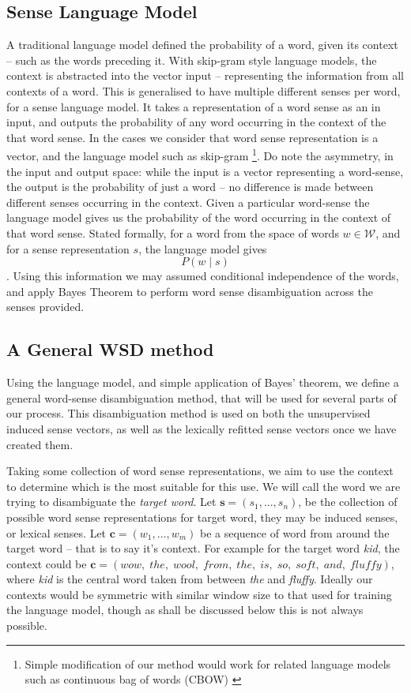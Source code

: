 \documentclass{sig-alternate}
\newcommand{\W}{\mathcal{W}}
\renewcommand{\c}{\mathbf{c}}
\newcommand{\s}{\mathbf{s}}
\begin{document}
\subsection{Sense Language Model} \label{senselanguagemodel}
A traditional language model defined the probability of a word, given its context -- such as the words preceding it.
With skip-gram style language models, the context is abstracted into the vector input -- representing the information from all contexts of a word. This is generalised to have multiple different senses per word, for a sense language model.
It takes a representation of a word sense as an in input, and outputs the probability of any word occurring in the context of the that word sense. In the cases we consider that word sense representation is a vector, and the language model such as skip-gram\parencite{mikolov2013efficient} \footnote{Simple modification of our method would work for related language models such as continuous bag of words (CBOW) \parencite{mikolov2013efficient}}. Do note the asymmetry, in the input and output space: while the input is a vector representing a word-sense, the output is the probability of just a word -- no difference is made between different senses occurring in the context. Given a particular word-sense the language model gives us the probability of the word occurring in the context of that word sense. Stated formally, for a word from the space of words $w\in \W$, and for a sense representation $s$, the language model gives $$P(w \mid s)$$. Using this information we may assumed conditional independence of the words, and apply Bayes Theorem to perform word sense disambiguation across the senses provided.

\subsection{A General WSD method} \label{generalwsd}
Using the language model, and simple application of Bayes' theorem, we define a general word-sense disambiguation method, that will be used for several parts of our process. This disambiguation method is used on both the unsupervised induced sense vectors, as well as the lexically refitted sense vectors once we have created them.

Taking some collection of word sense representations, we aim to use the context to determine which is the most suitable for this use.
We will call the word we are trying to disambiguate the \emph{target word}.
Let $\s=(s_{1},...,s_{n})$, be the collection of possible word sense representations for target word, they may be induced senses, or lexical senses.
Let $\c=(w_{1},...,w_{m})$ be a sequence of word from around the target word -- that is to say it's context.
For example for the target word \emph{kid}, the context could be \mbox{$\c=(wow,\; the,\; wool,\; from,\; the,\; is,\; so,\; soft,\; and,\; fluffy)$}, where \emph{kid} is the central word taken from between \emph{the} and \emph{fluffy}.
Ideally our contexts would be symmetric with similar window size to that used for training the language model, though as shall be discussed below this is not always possible.
 
\end{document}

